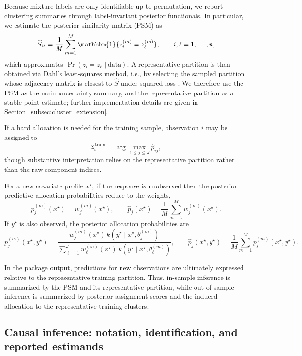 \documentclass[article]{jss}\usepackage[]{graphicx}\usepackage[]{xcolor}
\begin{document}
Because mixture labels are only identifiable up to permutation, we report clustering
summaries through label-invariant posterior functionals. In particular, we estimate
the posterior similarity matrix (PSM) as
\begin{equation*}
\widehat S_{i\ell}
=
\frac{1}{M}\sum_{m=1}^M
\mathbbm{1}\{z_i^{(m)}=z_\ell^{(m)}\},
\qquad i,\ell=1,\dots,n,
\end{equation*}
which approximates \(\Pr(z_i=z_\ell \mid \text{data})\). A representative partition is
then obtained via Dahl's least-squares method, i.e., by selecting the sampled partition
whose adjacency matrix is closest to \(\widehat S\) under squared loss
\citep{Dahl2006}. We therefore use the PSM as the main uncertainty summary, and the
representative partition as a stable point estimate; further implementation details are
given in Section~\ref{subsec:cluster_extension}.

If a hard allocation is needed for the training sample, observation \(i\) may be
assigned to
\[
\widehat z_i^{\,\mathrm{train}}
=
\arg\max_{1\le j\le J}\widehat p_{ij},
\]
though substantive interpretation relies on the representative partition rather than
the raw component indices.

For a new covariate profile \(x^\star\), if the response is unobserved then the
posterior predictive allocation probabilities reduce to the weights,
\[
p_j^{(m)}(x^\star)=w_j^{(m)}(x^\star),
\qquad
\widehat p_j(x^\star)=\frac{1}{M}\sum_{m=1}^M w_j^{(m)}(x^\star).
\]
If \(y^\star\) is also observed, the posterior allocation probabilities are
\[
p_j^{(m)}(x^\star,y^\star)
=
\frac{
w_j^{(m)}(x^\star)\,k(y^\star \mid x^\star,\theta_j^{(m)})
}{
\sum_{\ell=1}^J
w_\ell^{(m)}(x^\star)\,k(y^\star \mid x^\star,\theta_\ell^{(m)})
},
\qquad
\widehat p_j(x^\star,y^\star)
=
\frac{1}{M}\sum_{m=1}^M p_j^{(m)}(x^\star,y^\star).
\]

In the package output, predictions for new observations are ultimately expressed
relative to the representative training partition. Thus, in-sample inference is
summarized by the PSM and its representative partition, while out-of-sample inference
is summarized by posterior assignment scores and the induced allocation to the
representative training clusters.

\subsection{Causal inference: notation, identification, and reported estimands}
\label{subsec:causal}
\end{document}
